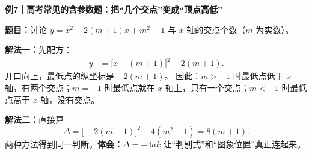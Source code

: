 \begin{examplebox}
\textbf{\textcolor{CExample}{例7｜高考常见的含参数题：把“几个交点”变成“顶点高低”}}


\textbf{题目：}讨论 $y=x^2-2(m+1)x+m^2-1$ 与 $x$ 轴的交点个数（$m$ 为实数）。

\textbf{解法一：}先配方：
\[
\begin{aligned}
y&=\bigl[x-(m+1)\bigr]^2-2(m+1).
\end{aligned}
\]
开口向上，最低点的纵坐标是 $-2(m+1)$。
因此：$m>-1$ 时最低点低于 $x$ 轴，有两个交点；$m=-1$ 时最低点就在 $x$ 轴上，只有一个交点；$m<-1$ 时最低点高于 $x$ 轴，没有交点。

\textbf{解法二：}直接算
\[
\Delta=\bigl[-2(m+1)\bigr]^2-4(m^2-1)=8(m+1).
\]
两种方法得到同一判断。\textbf{体会：}$\Delta=-4ak$ 让“判别式”和“图象位置”真正连起来。
\end{examplebox}
